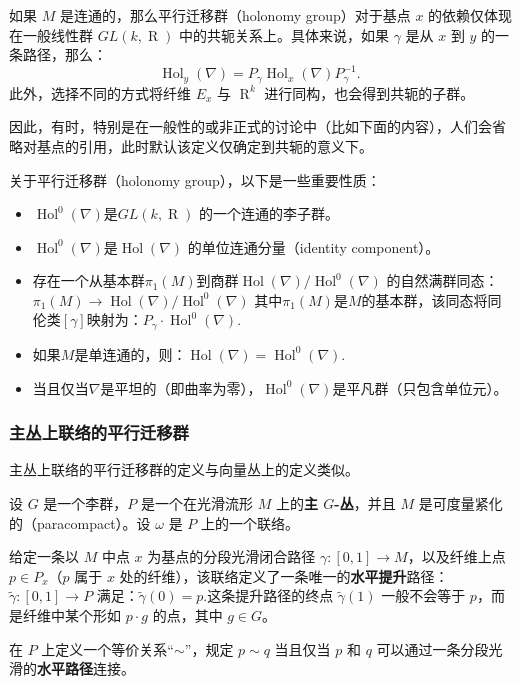 如果 \(M\) 是连通的，那么平行迁移群（holonomy group）对于基点 \(x\) 的依赖仅体现在一般线性群 \(GL(k, \operatorname{R})\) 中的共轭关系上。具体来说，如果 \(\gamma\) 是从 \(x\) 到 \(y\) 的一条路径，那么：
\[
\operatorname{Hol}_y(\nabla) = P_\gamma \operatorname{Hol}_x(\nabla) P_\gamma^{-1}.~
\]
此外，选择不同的方式将纤维 \(E_x\) 与 \(\operatorname{R}^k\) 进行同构，也会得到共轭的子群。  

因此，有时，特别是在一般性的或非正式的讨论中（比如下面的内容），人们会省略对基点的引用，此时默认该定义仅确定到共轭的意义下。

关于平行迁移群（holonomy group），以下是一些重要性质：
\begin{itemize}
\item \(\operatorname{Hol}^0(\nabla)\)是\(GL(k,\operatorname{R})\) 的一个连通的李子群。
\item \(\operatorname{Hol}^0(\nabla)\)是\(\operatorname{Hol}(\nabla)\) 的单位连通分量（identity component）。
\item 存在一个从基本群\(\pi_1(M)\)到商群\(\operatorname{Hol}(\nabla)/\operatorname{Hol}^0(\nabla)\) 的自然满群同态：\(\pi_1(M) \to \operatorname{Hol}(\nabla)/\operatorname{Hol}^0(\nabla)\)
其中\(\pi_1(M)\)是\(M\)的基本群，该同态将同伦类\([\gamma]\)映射为：\(P_\gamma \cdot \operatorname{Hol}^0(\nabla)\).
\item 如果\(M\)是单连通的，则：\(\operatorname{Hol}(\nabla) = \operatorname{Hol}^0(\nabla)\).
\item 当且仅当\(\nabla\)是平坦的（即曲率为零），\(\operatorname{Hol}^0(\nabla)\)是平凡群（只包含单位元）。
\end{itemize}
\subsubsection{主丛上联络的平行迁移群}  
主丛上联络的平行迁移群的定义与向量丛上的定义类似。  

设 \(G\) 是一个李群，\(P\) 是一个在光滑流形 \(M\) 上的\textbf{主 \(G\)-丛}，并且 \(M\) 是可度量紧化的（paracompact）。设 \(\omega\) 是 \(P\) 上的一个联络。  

给定一条以 \(M\) 中点 \(x\) 为基点的分段光滑闭合路径 \(\gamma : [0,1] \to M\)，以及纤维上点 \(p \in P_x\)（\(p\) 属于 \(x\) 处的纤维），该联络定义了一条唯一的\textbf{水平提升}路径：\(\tilde{\gamma} : [0,1] \to P\)
满足：\(\tilde{\gamma}(0) = p\).这条提升路径的终点 \(\tilde{\gamma}(1)\) 一般不会等于 \(p\)，而是纤维中某个形如 \(p \cdot g\) 的点，其中 \(g \in G\)。

在 \(P\) 上定义一个等价关系“\(\sim\)”，规定 \(p \sim q\) 当且仅当 \(p\) 和 \(q\) 可以通过一条分段光滑的\textbf{水平路径}连接。

